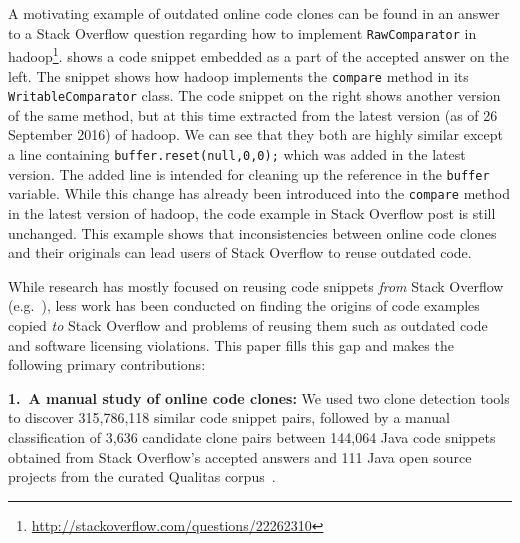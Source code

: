 \documentclass[sigconf,review, anonymous]{acmart}
\begin{document}
A motivating example of outdated online code clones can be found in an
answer to a Stack Overflow question regarding how to implement
{\small{\texttt{RawComparator}}} in
\textsf{hadoop}\footnote{\url{http://stackoverflow.com/questions/22262310}}.
 shows a code snippet embedded as a part of the
accepted answer on the left. The snippet shows how \textsf{hadoop}
implements the {\small{\texttt{compare}}} method in its
{\small{\texttt{WritableComparator}}} class. The code snippet on the
right shows another version of the same method, but at this time
extracted from the latest version (as of 26 September 2016) of
\textsf{hadoop}. We can see that they both are highly similar except a line
containing {\small{\verb|buffer.reset(null,0,0);|}} which was added in
the latest version. The added line is intended for cleaning up the
reference in the {\small{\verb|buffer|}} variable. While this change
has already been introduced into the {\small{\texttt{compare}}} method
in the latest version of \textsf{hadoop}, the code example in Stack
Overflow post is still unchanged. This example shows that
inconsistencies between online code clones and their originals can
lead users of Stack Overflow to reuse outdated code.

While research has mostly focused on reusing code snippets \emph{from}
Stack Overflow (e.g.~\cite{Keivanloo2014,An2017,Yang2016}), less work
has been conducted on finding the origins of code examples copied
\emph{to} Stack Overflow and problems of reusing them such as outdated
code and software licensing violations. This paper fills this gap and
makes the following primary contributions:

\vspace{0.5ex}%
\noindent\textbf{1.~A manual study of online code clones:} 
We used two clone detection tools to discover 315,786,118 similar code
snippet pairs, followed by a manual classification of 3,636 candidate
clone pairs between 144,064 Java code snippets obtained from Stack Overflow's
accepted answers and 111 Java open source projects from the curated
Qualitas corpus~\cite{QualitasCorpus}.
\end{document}

